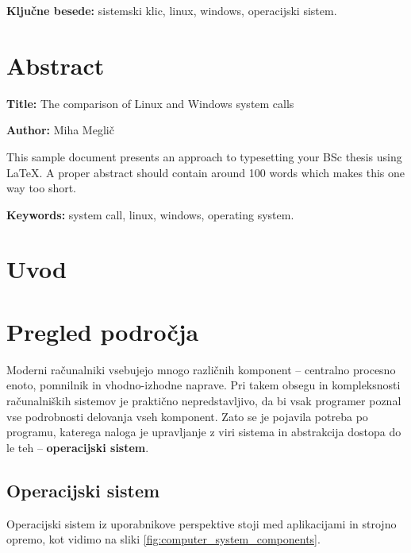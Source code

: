 \documentclass[a4paper,12pt,openright]{book}
\newcommand{\ttitleEn}{The comparison of Linux and Windows system calls}
\newcommand{\tauthor}{Miha Meglič}
\newcommand{\tkeywords}{sistemski klic, linux, windows, operacijski sistem}
\newcommand{\tkeywordsEn}{system call, linux, windows, operating system}
\newcommand{\clearemptydoublepage}{\newpage{\pagestyle{empty}\cleardoublepage}}
\begin{document}
\bigskip

\noindent\textbf{Ključne besede:} \tkeywords.
\clearemptydoublepage

\chapter*{Abstract}

\noindent\textbf{Title:} \ttitleEn
\bigskip

\noindent\textbf{Author:} \tauthor
\bigskip

\noindent This sample document presents an approach to typesetting your BSc thesis using \LaTeX. 
A proper abstract should contain around 100 words which makes this one way too short.
\bigskip

\noindent\textbf{Keywords:} \tkeywordsEn.
\clearemptydoublepage

\mainmatter
\setcounter{page}{1}
\pagestyle{fancy}

\chapter{Uvod}


\chapter{Pregled področja}

Moderni računalniki vsebujejo mnogo različnih komponent -- centralno procesno enoto, pomnilnik in vhodno-izhodne naprave.
Pri takem obsegu in kompleksnosti računalniških sistemov je praktično nepredstavljivo, da bi vsak programer poznal vse podrobnosti delovanja vseh komponent.
Zato se je pojavila potreba po programu, katerega naloga je upravljanje z viri sistema in abstrakcija dostopa do le teh -- \textbf{operacijski sistem}.

\section{Operacijski sistem}

Operacijski sistem iz uporabnikove perspektive stoji med aplikacijami in strojno opremo, kot vidimo na sliki \ref{fig:computer_system_components}.
\end{document}
